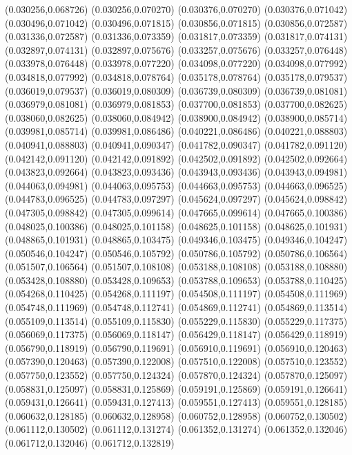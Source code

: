 (0.030256,0.068726)
(0.030256,0.070270)
(0.030376,0.070270)
(0.030376,0.071042)
(0.030496,0.071042)
(0.030496,0.071815)
(0.030856,0.071815)
(0.030856,0.072587)
(0.031336,0.072587)
(0.031336,0.073359)
(0.031817,0.073359)
(0.031817,0.074131)
(0.032897,0.074131)
(0.032897,0.075676)
(0.033257,0.075676)
(0.033257,0.076448)
(0.033978,0.076448)
(0.033978,0.077220)
(0.034098,0.077220)
(0.034098,0.077992)
(0.034818,0.077992)
(0.034818,0.078764)
(0.035178,0.078764)
(0.035178,0.079537)
(0.036019,0.079537)
(0.036019,0.080309)
(0.036739,0.080309)
(0.036739,0.081081)
(0.036979,0.081081)
(0.036979,0.081853)
(0.037700,0.081853)
(0.037700,0.082625)
(0.038060,0.082625)
(0.038060,0.084942)
(0.038900,0.084942)
(0.038900,0.085714)
(0.039981,0.085714)
(0.039981,0.086486)
(0.040221,0.086486)
(0.040221,0.088803)
(0.040941,0.088803)
(0.040941,0.090347)
(0.041782,0.090347)
(0.041782,0.091120)
(0.042142,0.091120)
(0.042142,0.091892)
(0.042502,0.091892)
(0.042502,0.092664)
(0.043823,0.092664)
(0.043823,0.093436)
(0.043943,0.093436)
(0.043943,0.094981)
(0.044063,0.094981)
(0.044063,0.095753)
(0.044663,0.095753)
(0.044663,0.096525)
(0.044783,0.096525)
(0.044783,0.097297)
(0.045624,0.097297)
(0.045624,0.098842)
(0.047305,0.098842)
(0.047305,0.099614)
(0.047665,0.099614)
(0.047665,0.100386)
(0.048025,0.100386)
(0.048025,0.101158)
(0.048625,0.101158)
(0.048625,0.101931)
(0.048865,0.101931)
(0.048865,0.103475)
(0.049346,0.103475)
(0.049346,0.104247)
(0.050546,0.104247)
(0.050546,0.105792)
(0.050786,0.105792)
(0.050786,0.106564)
(0.051507,0.106564)
(0.051507,0.108108)
(0.053188,0.108108)
(0.053188,0.108880)
(0.053428,0.108880)
(0.053428,0.109653)
(0.053788,0.109653)
(0.053788,0.110425)
(0.054268,0.110425)
(0.054268,0.111197)
(0.054508,0.111197)
(0.054508,0.111969)
(0.054748,0.111969)
(0.054748,0.112741)
(0.054869,0.112741)
(0.054869,0.113514)
(0.055109,0.113514)
(0.055109,0.115830)
(0.055229,0.115830)
(0.055229,0.117375)
(0.056069,0.117375)
(0.056069,0.118147)
(0.056429,0.118147)
(0.056429,0.118919)
(0.056790,0.118919)
(0.056790,0.119691)
(0.056910,0.119691)
(0.056910,0.120463)
(0.057390,0.120463)
(0.057390,0.122008)
(0.057510,0.122008)
(0.057510,0.123552)
(0.057750,0.123552)
(0.057750,0.124324)
(0.057870,0.124324)
(0.057870,0.125097)
(0.058831,0.125097)
(0.058831,0.125869)
(0.059191,0.125869)
(0.059191,0.126641)
(0.059431,0.126641)
(0.059431,0.127413)
(0.059551,0.127413)
(0.059551,0.128185)
(0.060632,0.128185)
(0.060632,0.128958)
(0.060752,0.128958)
(0.060752,0.130502)
(0.061112,0.130502)
(0.061112,0.131274)
(0.061352,0.131274)
(0.061352,0.132046)
(0.061712,0.132046)
(0.061712,0.132819)
